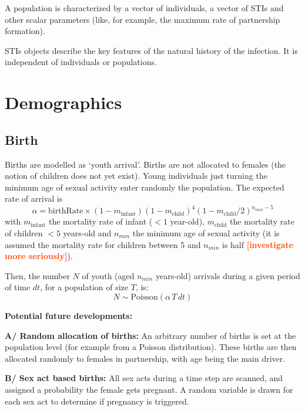 \documentclass[11pt, onecolumn]{article}
\newcommand{\warning}[1]{\textbf{\textcolor{OrangeRed}{#1}}}
\begin{document}
A population is characterized by a vector of individuals, a vector of STIs and other scalar parameters (like, for example, the maximum rate of partnership formation).

STIs objects describe the key features of the natural history of the infection. It is independent of individuals or populations.




\section{Demographics}

\subsection{Birth}

Births are modelled as `youth arrival'. Births are not allocated to females (the notion of children does not yet exist). Young individuals just turning the minimum age of sexual activity enter randomly the population. The expected rate of arrival is 
$$ \alpha = \mathrm{birthRate}\times(1-m_\mathrm{infant})(1-m_{\mathrm{child}})^4 (1-m_{\mathrm{child}}/2)^{n_{min}-5} $$
with $m_\mathrm{infant}$ the mortality rate of infant ($<1$ year-old), $m_\mathrm{child}$ the mortality rate of children $<5$ years-old and $n_{min}$ the minimum age of sexual activity (it is assumed the mortality rate for children between 5 and $n_{min}$ is half \warning{[investigate more seriously]}).

Then, the number $N$ of youth (aged $n_{min}$ years-old) arrivals during a given period of time $dt$, for a population of size $T$, is:
$$ N \sim \mathrm{Poisson} ( \alpha \, T \,dt)$$


\textbf{Potential future developments:}

\textbf{A/ Random allocation of births: } An arbitrary number of births is set at the population level (for example from a Poisson distribution). These births are then allocated randomly to females in partnership, with age being the main driver.

\textbf{B/ Sex act based births: } All sex acts during a time step are scanned, and assigned a probability the female gets pregnant. A random variable is drawn for each sex act to determine if pregnancy is triggered.
\end{document}
